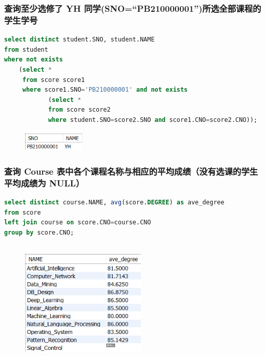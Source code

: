 \documentclass{ctexart}
\begin{document}
\subsubsection{查询至少选修了 YH 同学(SNO=“PB210000001”)所选全部课程的学生学号}
\begin{lstlisting}[language=sql]
select distinct student.SNO, student.NAME
from student
where not exists
	(select *
	 from score score1
     where score1.SNO='PB210000001' and not exists
			(select *
            from score score2
            where student.SNO=score2.SNO and score1.CNO=score2.CNO));
\end{lstlisting}
\begin{figure}[H]
	\centering 
	\includegraphics[height=1cm,width=3cm]{16.png}
	\end{figure}
\subsubsection{查询 Course 表中各个课程名称与相应的平均成绩（没有选课的学生平均成绩为 NULL） }
\begin{lstlisting}[language=sql]
select distinct course.NAME, avg(score.DEGREE) as ave_degree
from score
left join course on score.CNO=course.CNO
group by score.CNO;

\end{lstlisting}
\begin{figure}[H]
	\centering 
	\includegraphics[height=6cm,width=6cm]{39.png}
	\end{figure}
\end{document}
